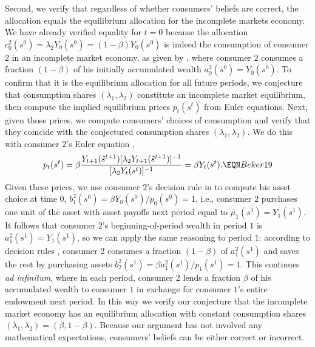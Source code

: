 Second, we verify that  regardless of whether
consumers' beliefs are correct, the  allocation equals the equilibrium allocation for the incomplete markets economy. We have already verified
equality for $t=0$
because the  allocation $c^2_0(s^0)=\lambda_2 Y_0(s^0)
= (1-\beta) Y_0(s^0)$ is indeed the consumption of consumer $2$ in
an incomplete market economy, as given by , where
consumer $2$ consumes a fraction $(1-\beta)$ of his initially
accumulated wealth $a^2_0(s^0)=Y_0(s^0)$. To confirm that it is the equilibrium allocation
for all future periods, we conjecture that consumption shares
$(\lambda_1, \lambda_2)$ constitute an incomplete market equilibrium,
then compute the implied equilibrium prices $p_t(s^t)$ from
Euler equations. Next, given those prices, we compute consumers' choices
of consumption and verify that they coincide with the conjectured
consumption shares $(\lambda_1, \lambda_2)$. We do this
with consumer $2$'s Euler equation ,
$$
p_t(s^t) = \beta {Y_{t+1}(\tilde s^{t+1}) [\lambda_2 Y_{t+1}(\tilde s^{t+1})]^{-1}
         \over [\lambda_2 Y_t(s^t)]^{-1} } = \beta Y_t(s^t).   \EQN Beker19
$$
Given these prices,
we use consumer $2$'s decision rule in  to compute his
asset choice at time $0$, $b^2_1(s^0) = \beta Y_0(s^0)/p_0(s^0) = 1$,
i.e., consumer $2$ purchases one unit of the asset with asset payoffs
next period equal to $\mu_1(s^1) = Y_1(s^1)$. It follows that
consumer $2$'s beginning-of-period wealth in period $1$ is
$a^2_1(s^1)=Y_1(s^1)$,
so we can apply the same  reasoning to period $1$:
according to decision rules , consumer $2$ consumes a fraction
$(1-\beta)$ of $a^2_1(s^1)$ and saves the rest by purchasing
assets $b^2_2(s^1)= \beta a^2_1(s^1)/p_1(s^1)=1$. This continues
{\it ad infinitum}, where in each period, consumer $2$ lends
a fraction $\beta$ of his accumulated wealth to consumer $1$ in exchange
for consumer $1$'s entire endowment  next period. In this way we  verify
our conjecture that the incomplete market economy has an equilibrium
allocation with constant consumption shares
$(\lambda_1, \lambda_2)=(\beta, 1-\beta)$. Because our argument has
not involved any mathematical expectations, consumers' beliefs can be either correct or
incorrect.


